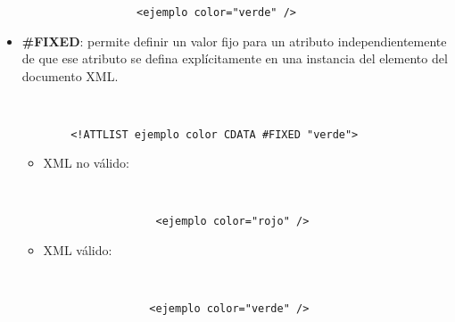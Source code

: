 \begin{itemize}
\begin{itemize}
\begin{figure}[H]
\begin{tcolorbox}[sharp corners, colback=yellow!30, colframe=white!20]
\begin{verbatim}
         <ejemplo color="verde" />
                \end{verbatim}
            \end{tcolorbox}
        \end{figure}
    \end{itemize}

    \item \textbf{\#FIXED}: permite definir un valor fijo para un atributo independientemente de que ese atributo se defina explícitamente en una instancia del elemento del documento XML.

          \begin{figure}[H]
        \begin{tcolorbox}[sharp corners, colback=yellow!30, colframe=white!20]
            \scriptsize
            \begin{verbatim}


  <!ATTLIST ejemplo color CDATA #FIXED "verde">
            \end{verbatim}
        \end{tcolorbox}
    \end{figure}

    \begin{itemize}
        \item XML no válido:

        \begin{figure}[H]
            \begin{tcolorbox}[sharp corners, colback=yellow!30, colframe=white!20]
                \scriptsize
                \begin{verbatim}


            <ejemplo color="rojo" />
                \end{verbatim}
            \end{tcolorbox}
        \end{figure}

        \item XML válido:

        \begin{figure}[H]
            \begin{tcolorbox}[sharp corners, colback=yellow!30, colframe=white!20]
                \scriptsize
                \begin{verbatim}


           <ejemplo color="verde" />
                \end{verbatim}
            \end{tcolorbox}
        \end{figure}
    \end{itemize}


\end{itemize}
